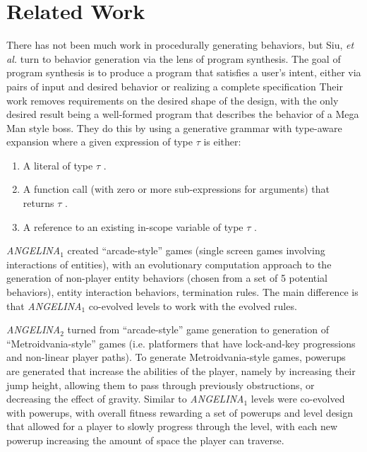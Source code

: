 \documentclass[12pt]{report}
\begin{document}
\section*{Related Work}

There has not been much work in procedurally generating behaviors, but Siu, \textit{et al.} \cite{programsynthesis} turn to behavior generation via the lens of program synthesis. The goal of program synthesis is to produce a program that satisfies a user's intent, either via pairs of input and desired behavior \cite{Oleksandr Polozov and Sumit Gulwani. 2015. FlashMeta: A framework for
inductive program synthesis} or realizing a complete specification \cite{Eric Schkufza, Rahul Sharma, and Alex Aiken. 2013. Stochastic Superoptimization.} Their work removes requirements on the desired shape of the design, with the only desired result being a well-formed program that describes the behavior of a Mega Man style boss.  They do this by using a generative grammar with type-aware expansion where a given expression of type $\tau$ is either:
\begin{enumerate}
\item A literal of type $\tau$ .
\item A function call (with zero or more sub-expressions for
arguments) that returns $\tau$ .
\item A reference to an existing in-scope variable of type $\tau$ .
\end{enumerate}

\textit{ANGELINA}$_{1}$ created ``arcade-style'' games (single screen games involving interactions of entities), with an evolutionary computation approach to the generation of non-player entity behaviors (chosen from a set of 5 potential behaviors), entity interaction behaviors, termination rules. The main difference is that \textit{ANGELINA}$_{1}$  co-evolved levels to work with the evolved rules.

\textit{ANGELINA}$_{2}$ turned from ``arcade-style'' game generation to generation of ``Metroidvania-style'' games (i.e. platformers that 
have lock-and-key progressions and non-linear player paths).  To generate Metroidvania-style games, powerups are generated that increase the abilities of the player, namely by increasing their jump height, allowing them to pass through previously obstructions, or decreasing the effect of gravity.  Similar to \textit{ANGELINA}$_{1}$ levels were co-evolved with powerups, with overall fitness rewarding a set of powerups and level design that allowed for a player to slowly progress through the level, with each new powerup increasing the amount of space the player can traverse.
\end{document}

